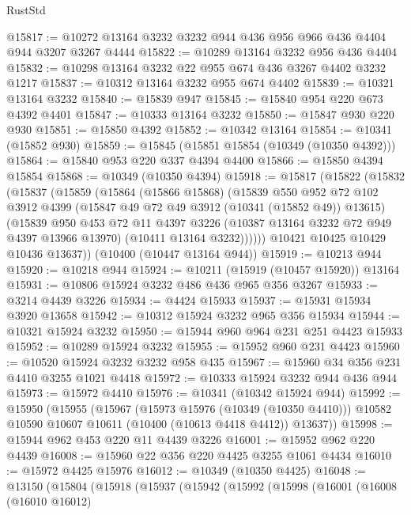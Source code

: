 \begin{lexlean}{RustStd}
\begin{coremodule}
{\begin{coremodule}
{{{{{{{{{{{{{{{{{{{{{{{{{@15817 := @10272 @13164 @3232 @3232 @944 @436 @956 @966 @436 @4404 @944 @3207 @3267 @4444
@15822 := @10289 @13164 @3232 @956 @436 @4404
@15832 := @10298 @13164 @3232 @22 @955 @674 @436 @3267 @4402 @3232 @1217
@15837 := @10312 @13164 @3232 @955 @674 @4402
@15839 := @10321 @13164 @3232
@15840 := @15839 @947
@15845 := @15840 @954 @220 @673 @4392 @4401
@15847 := @10333 @13164 @3232
@15850 := @15847 @930 @220 @930
@15851 := @15850 @4392
@15852 := @10342 @13164
@15854 := @10341 (@15852 @930)
@15859 := @15845 (@15851 @15854 (@10349 (@10350 @4392)))
@15864 := @15840 @953 @220 @337 @4394 @4400
@15866 := @15850 @4394 @15854
@15868 := @10349 (@10350 @4394)
@15918 := @15817
    (@15822
      (@15832
        (@15837
          (@15859
            (@15864
              (@15866 @15868)
              (@15839
                @550
                @952
                @72
                @102
                @3912
                @4399
                (@15847 @49 @72 @49 @3912 (@10341 (@15852 @49)) @13615)
                (@15839
                  @950
                  @453
                  @72
                  @11
                  @4397
                  @3226
                  (@10387 @13164 @3232 @72 @949 @4397 @13966 @13970)
                  (@10411 @13164 @3232))))))
        @10421
        @10425
        @10429
        @10436
        @13637))
    (@10400 (@10447 @13164 @944))
@15919 := @10213 @944
@15920 := @10218 @944
@15924 := @10211 (@15919 (@10457 @15920)) @13164
@15931 := @10806 @15924 @3232 @486 @436 @965 @356 @3267
@15933 := @3214 @4439 @3226
@15934 := @4424 @15933
@15937 := @15931 @15934 @3920 @13658
@15942 := @10312 @15924 @3232 @965 @356 @15934
@15944 := @10321 @15924 @3232
@15950 := @15944 @960 @964 @231 @251 @4423 @15933
@15952 := @10289 @15924 @3232
@15955 := @15952 @960 @231 @4423
@15960 := @10520 @15924 @3232 @3232 @958 @435
@15967 := @15960 @34 @356 @231 @4410 @3255 @1021 @4418
@15972 := @10333 @15924 @3232 @944 @436 @944
@15973 := @15972 @4410
@15976 := @10341 (@10342 @15924 @944)
@15992 := @15950
    (@15955
      (@15967
        (@15973 @15976 (@10349 (@10350 @4410)))
        @10582
        @10590
        @10607
        @10611
        (@10400 (@10613 @4418 @4412))
        @13637))
@15998 := @15944 @962 @453 @220 @11 @4439 @3226
@16001 := @15952 @962 @220 @4439
@16008 := @15960 @22 @356 @220 @4425 @3255 @1061 @4434
@16010 := @15972 @4425 @15976
@16012 := @10349 (@10350 @4425)
@16048 := @13150
    (@15804
      (@15918
        (@15937
          (@15942
            (@15992
              (@15998
                (@16001
                  (@16008
                    (@16010 @16012)
}}}}}}}}}}}}}}}}}}}}}}}}}
\end{coremodule}}
\end{coremodule}
\end{lexlean}

